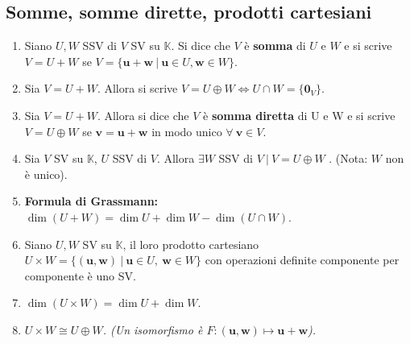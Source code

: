 \documentclass[draft]{article}
\newcommand{\bl}[1]{\mathbf{#1}}
\newcommand{\vu}{\mathbf{u}}
\newcommand{\vv}{\mathbf{v}}
\newcommand{\vw}{\mathbf{w}}
\begin{document}
\subsection{Somme, somme dirette, prodotti cartesiani}
\begin{enumerate}

\item Siano $U, W$ SSV di $V$ SV su $\mathbb{K}$. Si dice che $V$ è \textbf{somma} di $U$ e $W$ e si scrive $V= U + W$ se $V = \{ \vu + \vw \ | \ \vu \in U, \vw \in W \}$.

\item Sia $V=U+W$. Allora si scrive $V=U \oplus W \Leftrightarrow U \cap W = \{ \bl{0} _V \}$.

\item Sia $V=U+W$. Allora si dice che $V$ è \textbf{somma diretta} di U e W e si scrive $V=U \oplus W$ se $\vv = \vu + \vw $ in modo unico $\forall \ \vv \in V$.

\item Sia $V$ SV su $\mathbb{K}$, $U$ SSV di $V$. Allora $\exists W$ SSV di $V \ | \ V=U \oplus W$ . (Nota: $W$ non è unico).

\item \textbf{Formula di Grassmann:} $\dim (U+W) = \dim U + \dim W - \dim (U \cap W)$.

\item Siano $U, W$ SV su $\mathbb{K}$, il loro prodotto cartesiano $U \times W = \{ (\vu, \vw) \ | \ \vu \in U,\ \vw \in W \}$ con operazioni definite componente per componente è uno SV.

\item $\dim (U \times W)= \dim U + \dim W$.

\item \textit{$U \times W \cong U \oplus W$. (Un isomorfismo è $F: (\vu ,\vw ) \mapsto \vu +\vw $).}

\end{enumerate}
\end{document}

